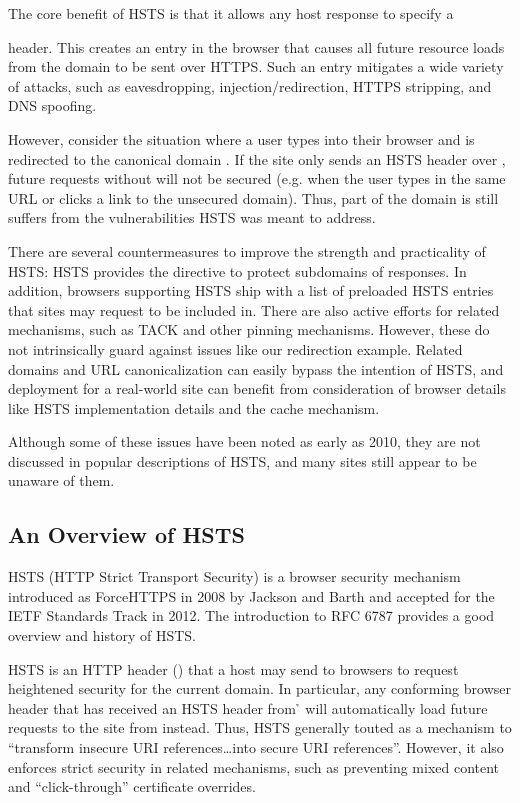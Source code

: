 \documentclass{acm_proc_article-sp}
\begin{document}
The core benefit of HSTS is that it allows any host response to specify a { header. This creates an entry in the browser that causes all future resource loads from the domain to be sent over HTTPS. Such an entry  mitigates a wide variety of attacks, such as eavesdropping, injection/redirection, HTTPS stripping, and DNS spoofing.

However, consider the situation where a user types {\site{\genericsite}} into their browser and is redirected to the canonical domain {\sw}. If the site only sends an HSTS header over {\sw}, future requests without  will not be secured (e.g. when the user types in the same URL or clicks a link to the unsecured domain). Thus, part of the domain is still suffers from the vulnerabilities HSTS was meant to address.

There are several countermeasures to improve the strength and practicality of HSTS: HSTS provides the {\iSD} directive to protect subdomains of responses. In addition, browsers supporting HSTS ship with a list of preloaded HSTS entries that sites may request to be included in. There are also active efforts for related mechanisms, such as TACK\cite{tack} and other pinning mechanisms. However, these do not intrinsically guard against issues like our redirection example. Related domains and URL canonicalization can easily bypass the intention of HSTS, and deployment for a real-world site can benefit from consideration of browser details like HSTS implementation details and the cache mechanism.

Although some of these issues have been noted as early as 2010\cite{coderrr-blog}, they are not discussed in popular descriptions of HSTS, and many sites still appear to be unaware of them.

\subsection{An Overview of HSTS}

HSTS (HTTP Strict Transport Security) is a browser security mechanism introduced as ForceHTTPS in 2008 by Jackson and Barth\cite{forcehttps} and accepted for the IETF Standards Track in 2012\cite{rfc}. The introduction to RFC 6787 provides a good overview and history of HSTS.

HSTS is an HTTP header ({}) that a host may send to browsers to request heightened security for the current domain. In particular, any conforming browser header that has received an HSTS header from {\h} will automatically load future requests to the site from {\s} instead. Thus, HSTS generally touted as a mechanism to ``transform insecure URI references\ldots into secure URI references''. However, it also enforces strict security in related mechanisms, such as preventing mixed content and ``click-through'' certificate overrides\cite{rfc}.

}
\end{document}
